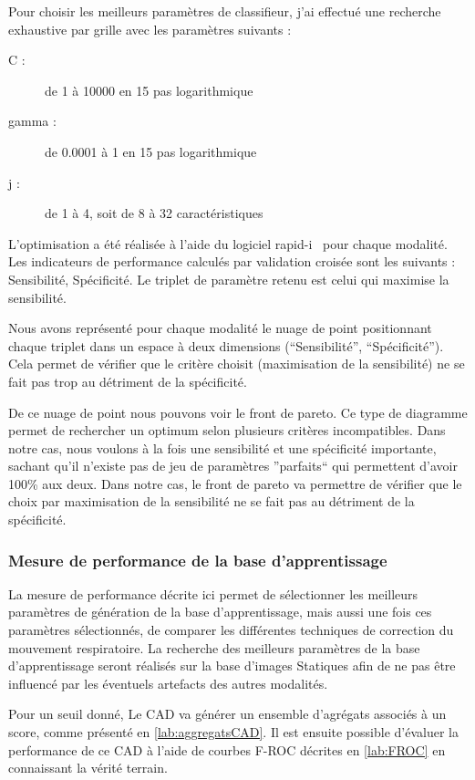 Pour choisir les meilleurs paramètres de classifieur, j'ai effectué une recherche exhaustive par grille avec les paramètres suivants :

\begin{description}
 \item [C :] de 1 à 10000 en 15 pas logarithmique
 \item [gamma :] de 0.0001 à 1 en 15 pas logarithmique
 \item [j :] de 1 à 4, soit de 8 à 32 caractéristiques
\end{description}

L'optimisation a été réalisée à l'aide du logiciel rapid-i~\cite{mierswa2006} pour chaque modalité. Les indicateurs de performance calculés par validation croisée sont les suivants : Sensibilité, Spécificité. Le triplet de paramètre retenu est celui qui maximise la sensibilité.

Nous avons représenté pour chaque modalité le nuage de point positionnant chaque triplet dans un espace à deux dimensions (``Sensibilité'', ``Spécificité''). Cela permet de vérifier que le critère choisit (maximisation de la sensibilité) ne se fait pas trop au détriment de la spécificité.

De ce nuage de point nous pouvons voir le front de pareto. Ce type de diagramme permet de rechercher un optimum selon plusieurs critères incompatibles. Dans notre cas, nous voulons à la fois une sensibilité et une spécificité importante, sachant qu'il n'existe pas de jeu de paramètres ''parfaits`` qui permettent d'avoir 100\% aux deux. Dans notre cas, le front de pareto va permettre de vérifier que le choix par maximisation de la sensibilité ne se fait pas au détriment de la spécificité.


\subsubsection{Mesure de performance de la base d'apprentissage}

La mesure de performance décrite ici permet de sélectionner les meilleurs paramètres de génération de la base d'apprentissage, mais aussi une fois ces paramètres sélectionnés, de comparer les différentes techniques de correction du mouvement respiratoire. La recherche des meilleurs paramètres de la base d'apprentissage seront réalisés sur la base d'images Statiques afin de ne pas être influencé par les éventuels artefacts des autres modalités.

Pour un seuil donné, Le CAD va générer un ensemble d'agrégats associés à un score, comme présenté en \ref{lab:aggregatsCAD}. Il est ensuite possible d'évaluer la performance de ce CAD à l'aide de courbes F-ROC décrites en \ref{lab:FROC} en connaissant la vérité terrain.

